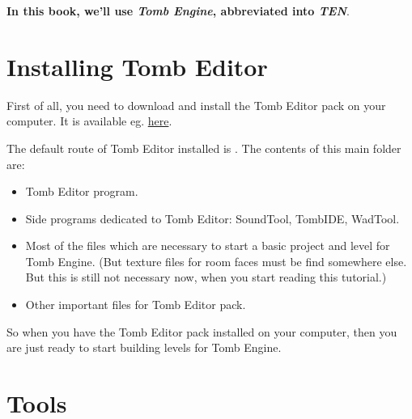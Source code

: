 \textbf{In this book, we'll use \emph{Tomb Engine}, abbreviated into \emph{TEN}}.


\chapter{Installing Tomb Editor}
First of all, you need to download and install the Tomb Editor pack on your computer. It is available eg. \href{https://tombengine.com/}{here}.
\par The default route of Tomb Editor installed is . The contents of this main folder are:
\begin{itemize}
    \item Tomb Editor program.
    \item Side programs dedicated to Tomb Editor: SoundTool, TombIDE, WadTool.
    \item Most of the files which are necessary to start a basic project and level for Tomb Engine. (But texture files for room faces must be find somewhere else. But this is still not necessary now, when you start reading this tutorial.)
    \item Other important files for Tomb Editor pack.
\end{itemize}
So when you have the Tomb Editor pack installed on your computer, then you are just ready to start building levels for Tomb Engine. \cite{akyv_tutorial}

\chapter{Tools}

